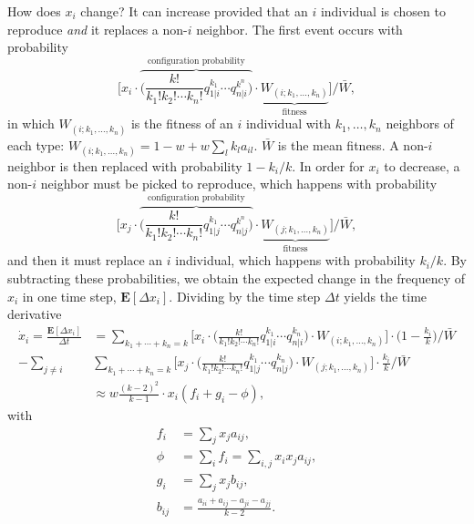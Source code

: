 \documentclass[14pt, a4paper, justified]{article}
\begin{document}
How does $x_i$ change?
It can increase provided that an $i$ individual is chosen to reproduce \emph{and} it replaces a non-$i$ neighbor.
The first event occurs with probability
\begin{equation}
    \Big[ x_i \cdot \overbrace{\Big( \frac{k!}{k_1! k_2! \cdots k_n!} q_{1|i}^{k_1} \cdots q_{n|i}^{k^n} \Big)}^{\textrm{configuration probability}} \cdot \underbrace{W_{(i; k_1, \ldots ,k_n)}}_{\textrm{fitness}} \Big] \Big/ \bar{W},
\end{equation}
in which $W_{(i; k_1, \ldots ,k_n)}$ is the fitness of an $i$ individual with $k_1, \ldots , k_n$ neighbors of each type: $W_{(i; k_1, \ldots ,k_n)} = 1 - w + w \sum_l k_l a_{il}$.
$\bar{W}$ is the mean fitness.
A non-$i$ neighbor is then replaced with probability $1 - k_i/k$.
In order for $x_i$ to decrease, a non-$i$ neighbor must be picked to reproduce, which happens with probability
\begin{equation}
    \Big[ x_j \cdot \overbrace{\Big( \frac{k!}{k_1! k_2! \cdots k_n!} q_{1|j}^{k_1} \cdots q_{n|j}^{k^n} \Big)}^{\textrm{configuration probability}} \cdot \underbrace{W_{(j; k_1, \ldots ,k_n)}}_{\textrm{fitness}} \Big] \Big/ \bar{W},
\end{equation}
and then it must replace an $i$ individual, which happens with probability $k_i/k$.
By subtracting these probabilities, we obtain the expected change in the frequency of $x_i$ in one time step, $\mathbf{E}[\Delta x_i]$.
Dividing by the time step $\Delta t$ yields the time derivative
\begin{equation}
    \begin{split}
        \dot{x}_i = \frac{\mathbf{E}[\Delta x_i]}{\Delta t} & = \sum_{k_1 + \cdots + k_n = k}  \Big[ x_i \cdot \Big( \frac{k!}{k_1! k_2! \cdots k_n!} q_{1|i}^{k_1} \cdots q_{n|i}^{k_n} \Big) \cdot W_{(i; k_1, \ldots ,k_n)} \Big] \cdot \Big(1 - \frac{k_i}{k} \Big)\Big/ \bar{W}
        \\
        - \sum_{j \neq i} & \sum_{k_1 + \cdots + k_n = k} \Big[ x_j \cdot \Big( \frac{k!}{k_1! k_2! \cdots k_n!} q_{1|j}^{k_1} \cdots q_{n|j}^{k_n} \Big) \cdot W_{(j; k_1, \ldots ,k_n)} \Big] \cdot \frac{k_i}{k} \Big/ \bar{W}
        \\
        & \approx w \frac{(k-2)^2}{k-1} \cdot x_i (f_i + g_i - \phi),
    \end{split}
    \label{eq:bd_replicator}
\end{equation}
with
\begin{equation}
    \begin{split}
        f_i & = \sum_j x_j a_{ij},
        \\
        \phi & = \sum_i f_i = \sum_{i,j} x_i x_j a_{ij},
        \\
        g_i & = \sum_j x_j b_{ij},
        \\
        b_{ij} & = \frac{a_{ii} + a_{ij} - a_{ji} - a_{jj}}{k-2}.
    \end{split}
    \label{eq:bd_coeffs}
\end{equation}
\end{document}
